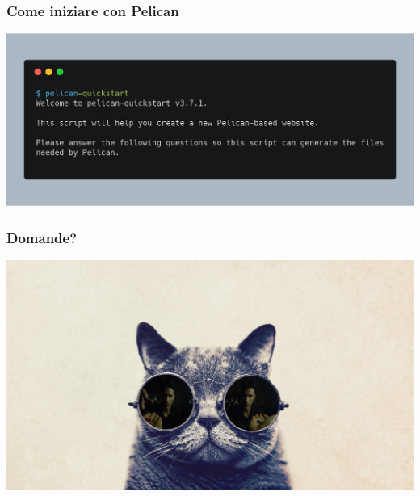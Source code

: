 \begin{frame}
  \frametitle{Come iniziare con Pelican}
		
		\begin{center}
			\includegraphics[scale=0.2]{img/quickstart.png}
		\end{center}  

\end{frame}


\begin{frame}
	\frametitle{Domande?}
	\begin{center}
		\includegraphics[scale=0.15]{img/cat-with-glasses}
	\end{center}
\end{frame}


